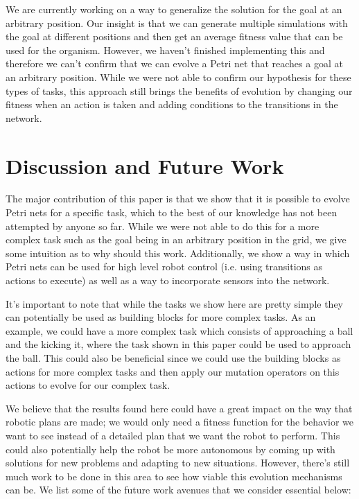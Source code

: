 \documentclass[12pt,a4paper,twocolumn]{article}
\begin{document}
We are currently working on a way to generalize the solution for the goal at an arbitrary position. Our insight is that we can generate multiple simulations with the goal at different positions and then get an average fitness value that can be used for the organism. However, we haven't finished implementing this and therefore we can't confirm that we can evolve a Petri net that reaches a goal at an arbitrary position. While we were not able to confirm our hypothesis for these types of tasks, this approach still brings the benefits of evolution by changing our fitness when an action is taken and adding conditions to the transitions in the network. 

\section{Discussion and Future Work}
The major contribution of this paper is that we show that it is possible to evolve Petri nets for a specific task, which to the best of our knowledge has not been attempted by anyone so far. While we were not able to do this for a more complex task such as the goal being in an arbitrary position in the grid, we give some intuition as to why should this work. Additionally, we show a way in which Petri nets can be used for high level robot control (i.e. using transitions as actions to execute) as well as a way to incorporate sensors into the network. 

It's important to note that while the tasks we show here are pretty simple they can potentially be used as building blocks for more complex tasks. As an example, we could have a more complex task which consists of approaching a ball and the kicking it, where the task shown in this paper could be used to approach the ball. This could also be beneficial since we could use the building blocks as actions for more complex tasks and then apply our mutation operators on this actions to evolve for our complex task. 

We believe that the results found here could have a great impact on the way that robotic plans are made; we would only need a fitness function for the behavior we want to see instead of a detailed plan that we want the robot to perform.  This could also potentially help the robot be more autonomous by coming up with solutions for new problems and adapting to new situations. However, there's still much work to be done in this area to see how viable this evolution mechanisms can be. We list some of the future work avenues that we consider essential below:
\end{document}
